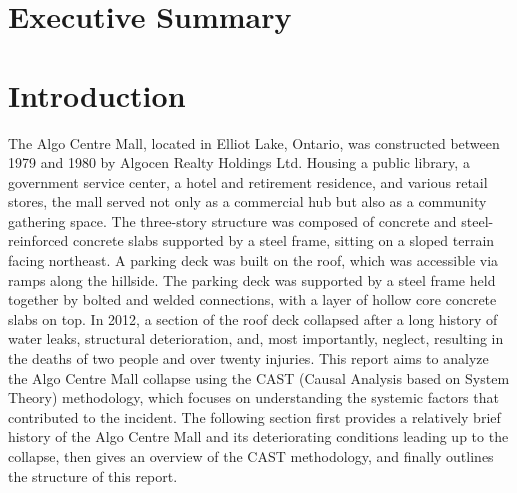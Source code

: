 \documentclass[12pt]{article}
\title{}
\date{June 2025}
\begin{document}
\maketitle

\newpage

\tableofcontents
\newpage

\section*{Executive Summary}


\section{Introduction} 

The Algo Centre Mall, located in Elliot Lake, Ontario, was constructed between 1979 and 1980 by Algocen Realty Holdings Ltd. Housing a public library, a government service center, a hotel and retirement residence, and various retail stores, the mall served not only as a commercial hub but also as a community gathering space. The three-story structure was composed of concrete and steel-reinforced concrete slabs supported by a steel frame, sitting on a sloped terrain facing northeast. A parking deck was built on the roof, which was accessible via ramps along the hillside. The parking deck was supported by a steel frame held together by bolted and welded connections, with a layer of hollow core concrete slabs on top. In 2012, a section of the roof deck collapsed after a long history of water leaks, structural deterioration, and, most importantly, neglect, resulting in the deaths of two people and over twenty injuries. This report aims to analyze the Algo Centre Mall collapse using the CAST (Causal Analysis based on System Theory) methodology, which focuses on understanding the systemic factors that contributed to the incident. The following section first provides a relatively brief history of the Algo Centre Mall and its deteriorating conditions leading up to the collapse, then gives an overview of the CAST methodology, and finally outlines the structure of this  report.
\end{document}
